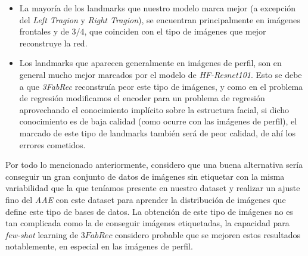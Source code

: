             \begin{itemize}
                \item La mayoría de los landmarks que nuestro modelo marca mejor (a excepción del \textit{Left Tragion} y \textit{Right Tragion}), se encuentran principalmente en imágenes frontales y de $3/4$, que coinciden con el tipo de imágenes que mejor reconstruye la red.
                \item Los landmarks que aparecen generalmente en imágenes de perfil, son en general mucho mejor marcados por el modelo de \textit{HF-Resnet101}. Esto se debe a que \textit{3FabRec} reconstruía peor este tipo de imágenes, y como en el problema de regresión modificamos el encoder para un problema de regresión aprovechando el conocimiento implícito sobre la estructura facial, si dicho conocimiento es de baja calidad (como ocurre con las imágenes de perfil), el marcado de este tipo de landmarks también será de peor calidad, de ahí los errores cometidos.
            \end{itemize}

            \medskip

            \noindent Por todo lo mencionado anteriormente, considero que una buena alternativa sería conseguir un gran conjunto de datos de imágenes sin etiquetar con la misma variabilidad que la que teníamos presente en nuestro dataset y realizar un ajuste fino del \textit{AAE} con este dataset para aprender la distribución de imágenes que define este tipo de bases de datos. La obtención de este tipo de imágenes no es tan complicada como la de conseguir imágenes etiquetadas, la capacidad para \textit{few-shot} learning de $3FabRec$ considero probable que se mejoren estos resultados notablemente, en especial en las imágenes de perfil.
            

\endinput



